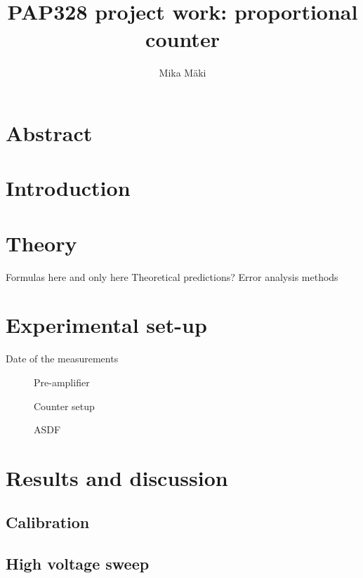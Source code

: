 \usepackage{hyperref}



\title{PAP328 project work: proportional counter}
\author{Mika Mäki}






\maketitle

\section*{Abstract}

\section{Introduction}

\section{Theory}
Formulas here and only here
Theoretical predictions?
Error analysis methods


\section{Experimental set-up}
Date of the measurements

\begin{figure}[ht!]
\caption{Pre-amplifier}
\end{figure}

\begin{figure}[ht!]
\caption{Counter setup}
\end{figure}

\begin{figure}[ht!]
\caption{ASDF}
\end{figure}

\section{Results and discussion}

\subsection{Calibration}

\subsection{High voltage sweep}

